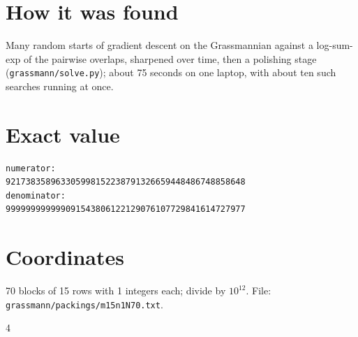 \documentclass[11pt,a4paper]{article}
\begin{document}
\section{How it was found}
Many random starts of gradient descent on the Grassmannian against a log-sum-exp of the pairwise overlaps, sharpened over time, then a polishing stage (\texttt{grassmann/solve.py}); about 75 seconds on one laptop, with about ten such searches running at once.


\appendix
\section{Exact value}
{\small
\begin{verbatim}
numerator:
921738358963305998152238791326659448486748858648
denominator:
999999999999091543806122129076107729841614727977
\end{verbatim}}

\section{Coordinates}
70 blocks of 15 rows with 1 integers each; divide by $10^{12}$. File: \texttt{grassmann/packings/m15n1N70.txt}.
{\tiny
\begin{multicols}{4}
\end{multicols}}
\end{document}

